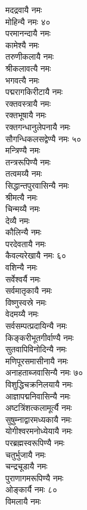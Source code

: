\begin{multicols}{2}
मदद्रवायै नमः\\
मोहिन्यै नमः \hfill ४०\\
परमानन्दायै नमः\\
कामेश्यै नमः\\
तरुणीकलायै नमः\\
श्रीकलावत्यै नमः\\
भगवत्यै नमः\\
पद्मरागकिरीटायै नमः\\
रक्तवस्त्रायै नमः\\
रक्तभूषायै नमः\\
रक्तगन्धानुलेपनायै  नमः\\
सौगन्धिकलसद्वेण्यै नमः \hfill ५०\\
मन्त्रिण्यै नमः\\
तन्त्ररूपिण्यै नमः\\
तत्वमय्यै नमः\\
सिद्धान्तपुरवासिन्यै नमः\\
श्रीमत्यै नमः\\
चिन्मय्यै नमः\\
देव्यै नमः\\
कौलिन्यै नमः\\
परदेवतायै नमः\\
कैवल्यरेखायै नमः \hfill ६०\\
वशिन्यै नमः\\
सर्वेश्वर्यै नमः\\
सर्वमातृकायै नमः\\
विष्णुस्वस्रे नमः\\
वेदमय्यै नमः\\
सर्वसम्पत्प्रदायिन्यै नमः\\
किङ्करीभूतगीर्वाण्यै नमः\\
सुतवापिविनोदिन्यै नमः\\
मणिपूरसमासीनायै नमः\\
अनाहताब्जवासिन्यै नमः \hfill ७०\\
विशुद्धिचक्रनिलयायै नमः\\
आज्ञापद्मनिवासिन्यै नमः\\
अष्टत्रिंशत्कलामूर्त्यै नमः\\
सुषुम्नाद्वारमध्यकायै नमः\\
योगीश्वरमनोध्येयायै नमः\\
परब्रह्मस्वरूपिण्यै नमः\\
चतुर्भुजायै नमः\\
चन्द्रचूडायै नमः\\
पुराणागमरूपिण्यै नमः\\
ओङ्कार्यै नमः \hfill ८०\\
विमलायै नमः\\

\end{multicols}
